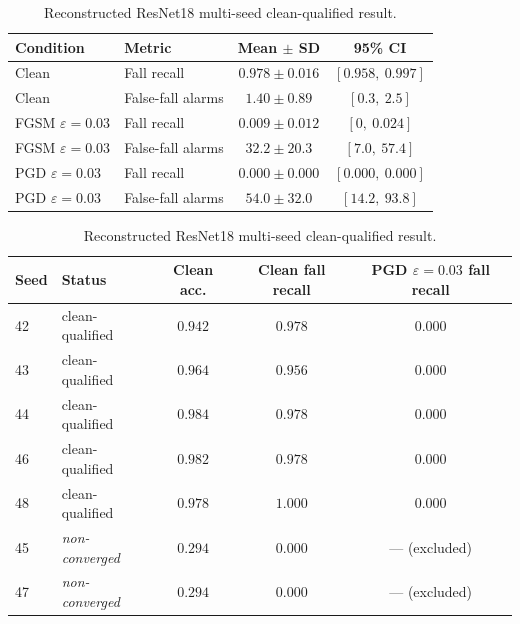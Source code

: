 \begin{table}[t]
  \centering
  \caption{Reconstructed ResNet18 multi-seed clean-qualified result.}
  \label{tab:resnet18-multiseed-reconstructed}
  \begin{tabular}{l l c c}
    \toprule
    Condition & Metric & Mean $\pm$ SD & 95\% CI \\
    \midrule
    Clean & Fall recall & $0.978 \pm 0.016$ & $[0.958,\ 0.997]$ \\
    Clean & False-fall alarms & $1.40 \pm 0.89$ & $[0.3,\ 2.5]$ \\
    \midrule
    FGSM $\varepsilon{=}0.03$ & Fall recall & $0.009 \pm 0.012$ & $[0,\ 0.024]$ \\
    FGSM $\varepsilon{=}0.03$ & False-fall alarms & $32.2 \pm 20.3$ & $[7.0,\ 57.4]$ \\
    \midrule
    PGD $\varepsilon{=}0.03$ & Fall recall & $\mathbf{0.000 \pm 0.000}$ & $[0.000,\ 0.000]$ \\
    PGD $\varepsilon{=}0.03$ & False-fall alarms & $54.0 \pm 32.0$ & $[14.2,\ 93.8]$ \\
    \bottomrule
  \end{tabular}

  \vspace{0.6em}

  \begin{tabular}{l l c c c}
    \toprule
    Seed & Status & Clean acc. & Clean fall recall & PGD $\varepsilon{=}0.03$ fall recall \\
    \midrule
    42 & clean-qualified & $0.942$ & $0.978$ & $0.000$ \\
    43 & clean-qualified & $0.964$ & $0.956$ & $0.000$ \\
    44 & clean-qualified & $0.984$ & $0.978$ & $0.000$ \\
    46 & clean-qualified & $0.982$ & $0.978$ & $0.000$ \\
    48 & clean-qualified & $0.978$ & $1.000$ & $0.000$ \\
    45 & \emph{non-converged} & $0.294$ & $0.000$ & --- (excluded) \\
    47 & \emph{non-converged} & $0.294$ & $0.000$ & --- (excluded) \\
    \bottomrule
  \end{tabular}
\end{table}
